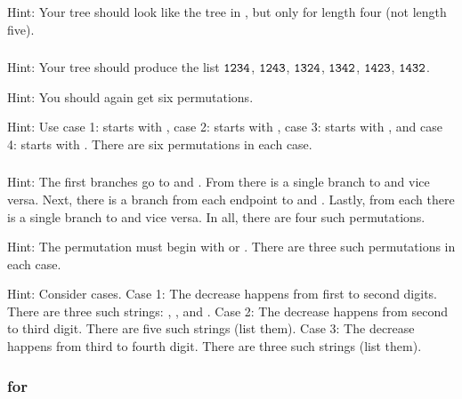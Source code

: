 \subsubsection*{ \answers}
Hint: Your tree should look like the tree in , but only for length four (not length five).

\subsubsection*{ \answers}
\begin{apart}
    \item Hint: Your tree should produce the list $\texttt{1234}$, $\texttt{1243}$, $\texttt{1324}$, $\texttt{1342}$, $\texttt{1423}$, $\texttt{1432}$.
    \item Hint: You should again get six permutations.
    \item Hint: Use case 1: starts with , case 2: starts with , case 3: starts with , and case 4: starts with . There are six permutations in each case. 
\end{apart}

\subsubsection*{ \answers}
\begin{apart}
    \item Hint: The first branches go to  and .  From  there is a single branch to  and vice versa.  Next, there is a branch from each endpoint to  and . Lastly, from each  there is a single branch to  and vice versa. In all, there are four such permutations.
    \item Hint: The permutation must begin with  or .  There are three such permutations in each case. 
    \item Hint: Consider cases. Case 1: The decrease happens from first to second digits. There are three such strings: , , and .  Case 2: The decrease happens from second to third digit. There are five such strings (list them). Case 3: The decrease happens from third to fourth digit.  There are three such strings (list them).
\end{apart}


\subsubsection{\answers for  \subintalgebra} 


